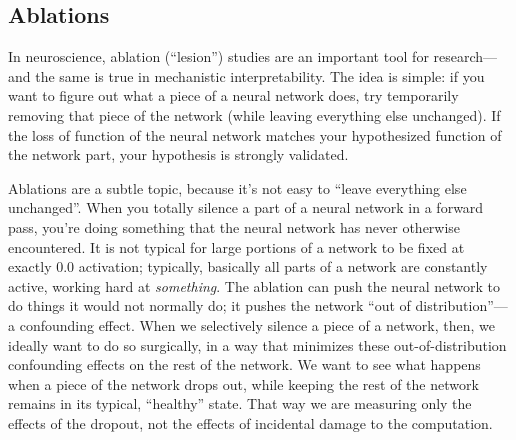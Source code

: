 
\subsection{Ablations}
In neuroscience, ablation (``lesion'') studies are an important tool for
research---and the same is true in mechanistic interpretability. The idea is
simple: if you want to figure out what a piece of a neural network does, try
temporarily removing that piece of the network (while leaving everything else
unchanged). If the loss of function of the neural network matches your
hypothesized function of the network part, your hypothesis is strongly
validated.

Ablations are a subtle topic, because it's not easy to ``leave everything else
unchanged''. When you totally silence a part of a neural network in a forward
pass, you're doing something that the neural network has never otherwise
encountered. It is not typical for large portions of a network to be fixed at
exactly $0.0$ activation; typically, basically all parts of a network are
constantly active, working hard at \emph{something}. The ablation can push the
neural network to do things it would not normally do; it pushes the network
``out of distribution''---a confounding effect. When we selectively silence a
piece of a network, then, we ideally want to do so surgically, in a way that
minimizes these out-of-distribution confounding effects on the rest of the
network. We want to see what happens when a piece of the network drops out,
while keeping the rest of the network remains in its typical, ``healthy''
state. That way we are measuring only the effects of the dropout, not the
effects of incidental damage to the computation.

